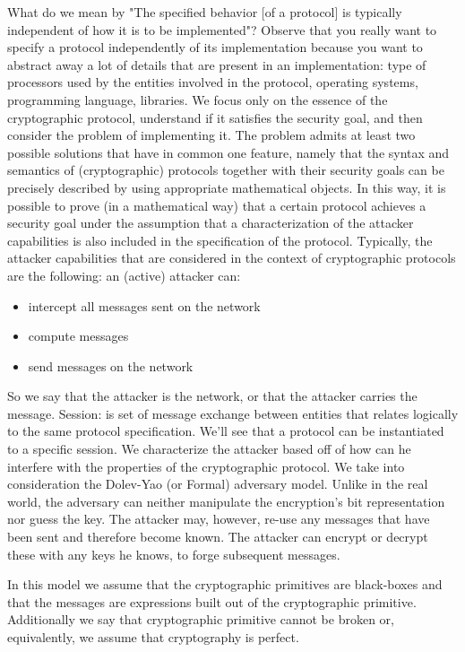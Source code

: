 What do we mean by "The specified behavior [of a protocol] is typically independent of how it is to be implemented"? Observe that you really want to specify a protocol independently of its implementation because you want to abstract away a lot of details that are present in an implementation: type of processors used by the entities involved in the protocol, operating systems, programming language, libraries. We focus only on the essence of the cryptographic protocol, understand if it satisfies the security goal, and then consider the problem of implementing it.
The problem admits at least two possible solutions that have in common one feature, namely that the syntax and semantics of (cryptographic) protocols together with their security goals can be precisely described by using appropriate mathematical objects.
In this way, it is possible to prove (in a mathematical way) that a certain protocol achieves a security goal under the assumption that a characterization of the attacker capabilities is also included in the specification of the protocol. Typically, the attacker capabilities that are considered in the context of cryptographic protocols are the following: an (active) attacker can: 
\begin{itemize}
	\item intercept all messages sent on the network
	\item compute messages
	\item send messages on the network
\end{itemize}

So we say that the attacker is the network, or that the attacker carries the message.
Session: is set of message exchange between entities that relates logically to the same protocol specification. We'll see that a protocol can be instantiated to a specific session.
We characterize the attacker based off of how can he interfere with the properties of the cryptographic protocol. We take into consideration the Dolev-Yao (or Formal) adversary model. Unlike in the real world, the adversary can neither manipulate the encryption's bit representation nor guess the key. The attacker may, however, re-use any messages that have been sent and therefore become known. The attacker can encrypt or decrypt these with any keys he knows, to forge subsequent messages. 

In this model we assume that the cryptographic primitives are black-boxes and that the messages are expressions built out of the cryptographic primitive. Additionally we say that cryptographic primitive cannot be broken or, equivalently, we assume that cryptography is perfect.

